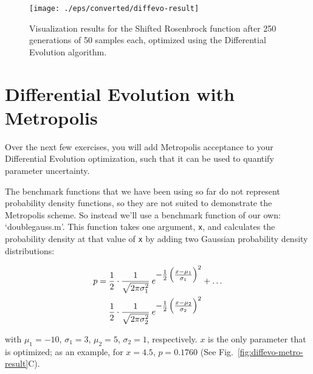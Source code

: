 \begin{figure}[htbp]
  \centering
    \texttt{[image: ./eps/converted/diffevo-result]}
  \caption{Visualization results for the Shifted Rosenbrock function after 250
  generations of 50 samples each, optimized using the Differential Evolution
  algorithm.}
  \label{fig:diffevo-result}
\end{figure}








\section{Differential Evolution with Metropolis}

Over the next few exercises, you will add Metropolis acceptance to your
Differential Evolution optimization, such that it can be used to quantify parameter
uncertainty.


The benchmark functions that we have been using so far do not represent
probability density functions, so they are not suited to demonstrate the
Metropolis scheme. So instead we'll use a benchmark function of our own:
`doublegauss.m'. This function takes one argument, \texttt{x}, and calculates
the probability density at that value of \texttt{x} by adding two Gaussian
probability density distributions:

\begin{align}
\label{eq:double-normal} 
p = \frac{1}{2}\cdot{}\frac{1}{\sqrt{2\pi\sigma_1^2}}\:e^\mathlarger{-\frac{1}{2}\left(\frac{x-\mu_1}{\sigma_1}\right)^2} & +\dots \\ \nonumber
    \frac{1}{2}\cdot{}\frac{1}{\sqrt{2\pi\sigma_2^2}}\:e^\mathlarger{-\frac{1}{2}\left(\frac{x-\mu_2}{\sigma_2}\right)^2}
\end{align}

with $\mu_1 = -10$, $\sigma_1 = 3$, $\mu_2 = 5$, $\sigma_2 = 1$, respectively.
$x$ is the only parameter that is optimized; as an example, for $x=4.5$, $p =
0.1760$ (See Fig.~\ref{fig:diffevo-metro-result}C).

